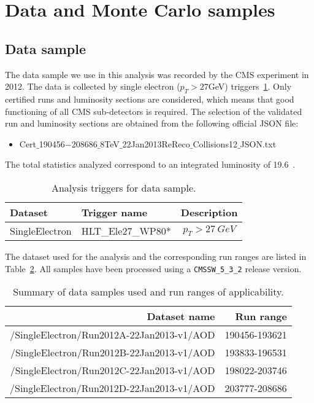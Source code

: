 \section{Data and Monte Carlo samples}
\label{sec:DataAndMC}

\subsection{Data sample}
The data sample we use in this analysis was recorded by the CMS experiment 
in 2012. The data is collected by single electron ($p_T>27$GeV) triggers~\ref{tab:triggers}. 
Only certified runs and luminosity sections are considered, which 
means that good functioning of all CMS sub-detectors is required.
The selection of the validated run and luminosity sections are obtained from the following official JSON file:
\begin{itemize}
\item{\small{Cert$\_$190456$-$208686$\_$8TeV$\_$22Jan2013ReReco$\_$Collisions12$\_$JSON.txt}}
\end{itemize}
 The total 
statistics analyzed correspond to an integrated luminosity of 19.6~\fbinv.

\begin{table}[htbp]
  \begin{center}
 {\small
  \begin{tabular} {l|l|c}
\hline
  Dataset & Trigger name & Description\\
  \hline \hline
  SingleElectron & HLT\_Ele27\_WP80*        & $p_T>27~GeV$ \\
  \hline
  \end{tabular}
}
  \caption{Analysis triggers for data sample.\label{tab:triggers}}
  \end{center}
\end{table}

The dataset used for the analysis and the corresponding run ranges are 
listed in Table~\ref{tab:datasets}. All samples have been processed using a 
\texttt{CMSSW\_5\_3\_2} release version.

\begin{table}[]
  \begin{center}
  \begin{tabular}{r|r}
  \hline
  Dataset name & Run range \\
  \hline
  /SingleElectron/Run2012A-22Jan2013-v1/AOD   &  190456-193621           \\
  \hline
  /SingleElectron/Run2012B-22Jan2013-v1/AOD   &   193833-196531       \\
  \hline
  /SingleElectron/Run2012C-22Jan2013-v1/AOD & 198022-203746\\
  \hline
  /SingleElectron/Run2012D-22Jan2013-v1/AOD  & 203777-208686 \\
  
  \hline
  \hline
  \end{tabular}
  \end{center}
  \caption{Summary of data samples used and run ranges of applicability.}
  \label{tab:datasets}
\end{table}%
